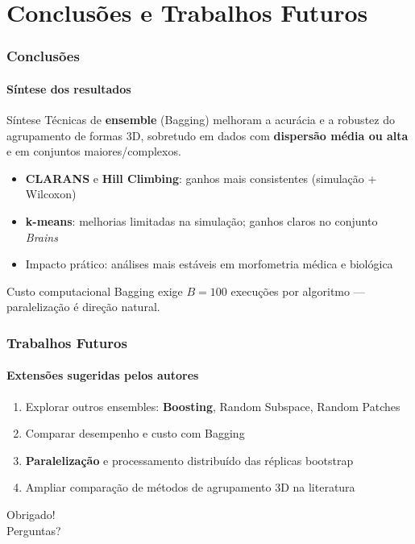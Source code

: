 \documentclass[brazilian,11pt]{beamer}
\begin{document}
\section[Conclusões]{Conclusões e Trabalhos Futuros}

\begin{frame}
    \frametitle{Conclusões}
    \framesubtitle{Síntese dos resultados}

    \begin{block}{Síntese}
        Técnicas de \textbf{ensemble} (Bagging) melhoram a acurácia e a robustez do agrupamento de formas 3D, sobretudo em dados com \textbf{dispersão média ou alta} e em conjuntos maiores/complexos.
    \end{block}

    \begin{itemize}
        \item \textbf{CLARANS} e \textbf{Hill Climbing}: ganhos mais consistentes (simulação + Wilcoxon)
        \item \textbf{k-means}: melhorias limitadas na simulação; ganhos claros no conjunto \textit{Brains}
        \item Impacto prático: análises mais estáveis em morfometria médica e biológica
    \end{itemize}

    \begin{alertblock}{Custo computacional}
        Bagging exige $B=100$ execuções por algoritmo --- paralelização é direção natural.
    \end{alertblock}
\end{frame}

\begin{frame}
    \frametitle{Trabalhos Futuros}
    \framesubtitle{Extensões sugeridas pelos autores}

    \begin{enumerate}
        \item Explorar outros ensembles: \textbf{Boosting}, Random Subspace, Random Patches
        \item Comparar desempenho e custo com Bagging
        \item \textbf{Paralelização} e processamento distribuído das réplicas bootstrap
        \item Ampliar comparação de métodos de agrupamento 3D na literatura
    \end{enumerate}

    \vspace{0.5em}
    \begin{center}
        \Large Obrigado!\\
        \normalsize Perguntas?
    \end{center}
\end{frame}
\end{document}
